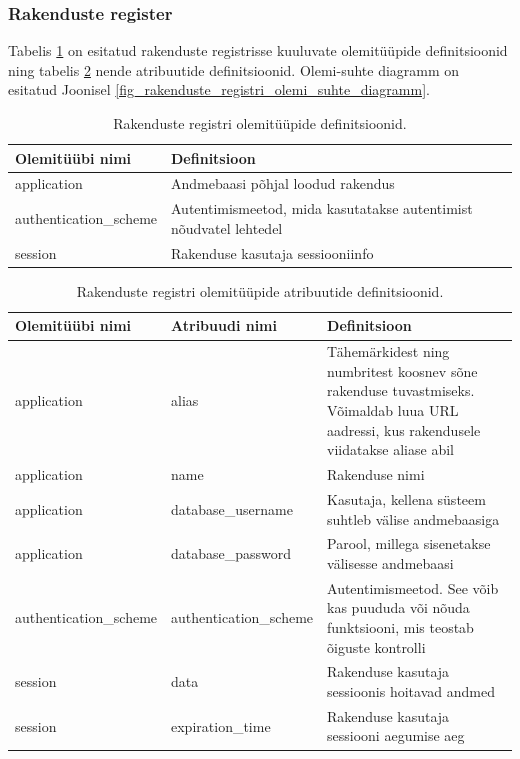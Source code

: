 \documentclass[a4paper,12pt]{article} %
\begin{document}
\subsubsection{Rakenduste register}
Tabelis \ref{table_er_rakenduste_registri_olemitüüpide_definitsioonid} on esitatud rakenduste registrisse kuuluvate olemitüüpide definitsioonid ning tabelis \ref{table_er_rakenduste_registri_olemitüüpide_atribuutide_definitsioonid} nende atribuutide definitsioonid. Olemi-suhte diagramm on esitatud Joonisel \ref{fig_rakenduste_registri_olemi_suhte_diagramm}.

\begin{table}[H]
\centering
\caption{Rakenduste registri olemitüüpide definitsioonid.}
\label{table_er_rakenduste_registri_olemitüüpide_definitsioonid}
\begin{tabular}{|p{4cm}|p{11cm}|}
\hline
\rowcolor{rowgray}
Olemitüübi nimi & Definitsioon \\ \hline
application & Andmebaasi põhjal loodud rakendus \\ \hline
authentication\_scheme & Autentimismeetod, mida kasutatakse autentimist nõudvatel lehtedel \\ \hline
session & Rakenduse kasutaja sessiooniinfo \\ \hline
\end{tabular}
\end{table}

\begin{table}[H]
\centering
\caption{Rakenduste registri olemitüüpide atribuutide definitsioonid.}
\label{table_er_rakenduste_registri_olemitüüpide_atribuutide_definitsioonid}
\begin{tabular}{|p{4cm}|p{4cm}|p{7cm}|}
\hline
\rowcolor{rowgray}
Olemitüübi nimi & Atribuudi nimi & Definitsioon \\ \hline
application & alias & Tähemärkidest ning numbritest koosnev sõne rakenduse tuvastmiseks. Võimaldab luua URL aadressi, kus rakendusele viidatakse aliase abil \\ \hline
application  & name & Rakenduse nimi \\ \hline
application  & database\_username & Kasutaja, kellena süsteem suhtleb välise andmebaasiga \\ \hline
application  & database\_password & Parool, millega sisenetakse välisesse andmebaasi \\ \hline
authentication\_scheme & authentication\_scheme & Autentimismeetod. See võib kas puududa või nõuda funktsiooni, mis teostab õiguste kontrolli \\ \hline
session & data & Rakenduse kasutaja sessioonis hoitavad andmed \\ \hline
session & expiration\_time & Rakenduse kasutaja sessiooni aegumise aeg \\ \hline
\end{tabular}
\end{table}
\end{document}
